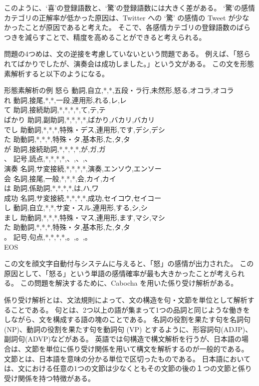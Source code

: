 \documentclass[11pt,a4j]{jsarticle}
\begin{document}
このように、`喜'の登録語数と、`驚'の登録語数には大きく差がある。
`驚'の感情カテゴリの正解率が低かった原因は、Twitter への `驚' の感情の Tweet が少なかったことが原因であると考えた。
そこで、各感情カテゴリの登録語数のばらつきを減らすことで、精度を高めることができると考えられる。

問題の4つめは、文の逆接を考慮していないという問題である。
例えば、「怒られてばかりでしたが、演奏会は成功しました。」という文がある。
この文を形態素解析すると以下のようになる。

\begin{itembox}[l]{形態素解析の例}
  怒ら  動詞,自立,*,*,五段・ラ行,未然形,怒る,オコラ,オコラ\\
  れ  動詞,接尾,*,*,一段,連用形,れる,レ,レ\\
  て  助詞,接続助詞,*,*,*,*,て,テ,テ\\
  ばかり  助詞,副助詞,*,*,*,*,ばかり,バカリ,バカリ\\
  でし  助動詞,*,*,*,特殊・デス,連用形,です,デシ,デシ\\
  た  助動詞,*,*,*,特殊・タ,基本形,た,タ,タ\\
  が  助詞,接続助詞,*,*,*,*,が,ガ,ガ\\
  、  記号,読点,*,*,*,*,、,、,、\\
  演奏  名詞,サ変接続,*,*,*,*,演奏,エンソウ,エンソー\\
  会  名詞,接尾,一般,*,*,*,会,カイ,カイ\\
  は  助詞,係助詞,*,*,*,*,は,ハ,ワ\\
  成功  名詞,サ変接続,*,*,*,*,成功,セイコウ,セイコー\\
  し  動詞,自立,*,*,サ変・スル,連用形,する,シ,シ\\
  まし  助動詞,*,*,*,特殊・マス,連用形,ます,マシ,マシ\\
  た  助動詞,*,*,*,特殊・タ,基本形,た,タ,タ\\
  。  記号,句点,*,*,*,*,。,。,。\\
  EOS
\end{itembox}

この文を顔文字自動付与システムに与えると、「怒」の感情が出力された。
この原因として、「怒る」という単語の感情確率が最も大きかったことが考えられる。
この問題を解決するために、Cabocha を用いた係り受け解析がある。

係り受け解析とは、文法規則によって、文の構造を句・文節を単位として解析することである。
句とは、2つ以上の語が集まって1つの品詞と同じような働きをしながら、文を構成する語の塊のことである。
名詞の役割を果たす句を名詞句 (NP)、動詞の役割を果たす句を動詞句 (VP) とするように、形容詞句(ADJP)、副詞句(ADVP)などがある。
英語では句構造で構文解析を行うが、日本語の場合は、文節を単位に係り受け関係を用いて構文を解析するのが一般的である。
文節とは、日本語を意味の分かる単位で区切ったものである。
日本語においては、文における任意の1つの文節は少なくともその文節の後の１つの文節と係り受け関係を持つ特徴がある。
\end{document}
